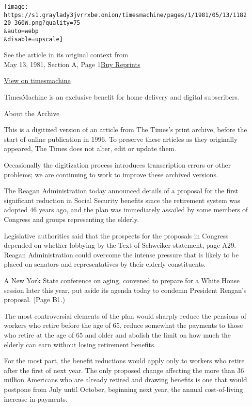 \texttt{[image: https://s1.graylady3jvrrxbe.onion/timesmachine/pages/1/1981/05/13/118220\_360W.png?quality=75\\\&auto=webp\\\&disable=upscale]}

See the article in its original context from\\
May 13, 1981, Section A, Page
1\href{https://store.nytimes3xbfgragh.onion/collections/new-york-times-page-reprints?utm_source=nytimes\&utm_medium=article-page\&utm_campaign=reprints}{Buy
Reprints}

\href{http://timesmachine.nytimes3xbfgragh.onion/timesmachine/1981/05/13/118220.html}{View
on timesmachine}

TimesMachine is an exclusive benefit for home delivery and digital
subscribers.

About the Archive

This is a digitized version of an article from The Times's print
archive, before the start of online publication in 1996. To preserve
these articles as they originally appeared, The Times does not alter,
edit or update them.

Occasionally the digitization process introduces transcription errors or
other problems; we are continuing to work to improve these archived
versions.

The Reagan Administration today announced details of a proposal for the
first significant reduction in Social Security benefits since the
retirement system was adopted 46 years ago, and the plan was immediately
assailed by some members of Congress and groups representing the
elderly.

Legislative authorities said that the prospects for the proposals in
Congress depended on whether lobbying by the Text of Schweiker
statement, page A29. Reagan Administration could overcome the intense
pressure that is likely to be placed on senators and representatives by
their elderly constituents.

A New York State conference on aging, convened to prepare for a White
House session later this year, put aside its agenda today to condemn
President Reagan's proposal. (Page B1.)

The most controversial elements of the plan would sharply reduce the
pensions of workers who retire before the age of 65, reduce somewhat the
payments to those who retire at the age of 65 and older and abolish the
limit on how much the elderly can earn without losing retirement
benefits.

For the most part, the benefit reductions would apply only to workers
who retire after the first of next year. The only proposed change
affecting the more than 36 million Americans who are already retired and
drawing benefits is one that would postpone from July until October,
beginning next year, the annual cost-of-living increase in payments.

